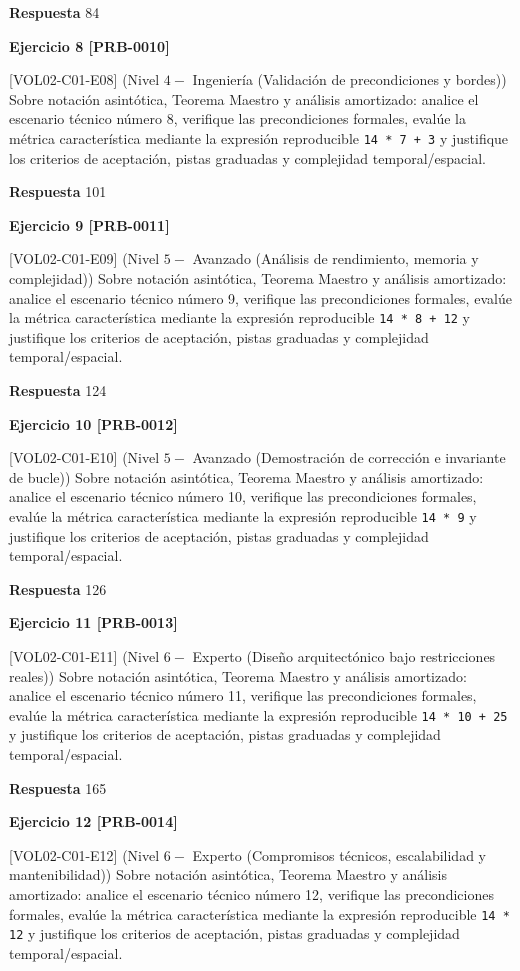 \documentclass{book}
\begin{document}
\noindent\textbf{Respuesta} 84

\noindent\textbf{Ejercicio 8 [PRB-0010]}

[VOL02-C01-E08] (Nivel \(4 -\) Ingeniería (Validación de precondiciones y bordes)) Sobre notación asintótica, Teorema Maestro y análisis amortizado: analice el escenario técnico número 8, verifique las precondiciones formales, evalúe la métrica característica mediante la expresión reproducible \texttt{14 * 7 + 3} y justifique los criterios de aceptación, pistas graduadas y complejidad temporal/espacial.

\noindent\textbf{Respuesta} 101

\noindent\textbf{Ejercicio 9 [PRB-0011]}

[VOL02-C01-E09] (Nivel \(5 -\) Avanzado (Análisis de rendimiento, memoria y complejidad)) Sobre notación asintótica, Teorema Maestro y análisis amortizado: analice el escenario técnico número 9, verifique las precondiciones formales, evalúe la métrica característica mediante la expresión reproducible \texttt{14 * 8 + 12} y justifique los criterios de aceptación, pistas graduadas y complejidad temporal/espacial.

\noindent\textbf{Respuesta} 124

\noindent\textbf{Ejercicio 10 [PRB-0012]}

[VOL02-C01-E10] (Nivel \(5 -\) Avanzado (Demostración de corrección e invariante de bucle)) Sobre notación asintótica, Teorema Maestro y análisis amortizado: analice el escenario técnico número 10, verifique las precondiciones formales, evalúe la métrica característica mediante la expresión reproducible \texttt{14 * 9} y justifique los criterios de aceptación, pistas graduadas y complejidad temporal/espacial.

\noindent\textbf{Respuesta} 126

\noindent\textbf{Ejercicio 11 [PRB-0013]}

[VOL02-C01-E11] (Nivel \(6 -\) Experto (Diseño arquitectónico bajo restricciones reales)) Sobre notación asintótica, Teorema Maestro y análisis amortizado: analice el escenario técnico número 11, verifique las precondiciones formales, evalúe la métrica característica mediante la expresión reproducible \texttt{14 * 10 + 25} y justifique los criterios de aceptación, pistas graduadas y complejidad temporal/espacial.

\noindent\textbf{Respuesta} 165

\noindent\textbf{Ejercicio 12 [PRB-0014]}

[VOL02-C01-E12] (Nivel \(6 -\) Experto (Compromisos técnicos, escalabilidad y mantenibilidad)) Sobre notación asintótica, Teorema Maestro y análisis amortizado: analice el escenario técnico número 12, verifique las precondiciones formales, evalúe la métrica característica mediante la expresión reproducible \texttt{14 * 12} y justifique los criterios de aceptación, pistas graduadas y complejidad temporal/espacial.
\end{document}
